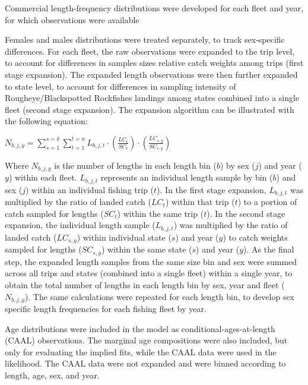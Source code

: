 \documentclass[
]{scrartcl}
\begin{document}
Commercial length-frequency distributions were developed for each fleet
and year, for which observations were available

Females and males distributions were treated separately, to track
sex-specific differences. For each fleet, the raw observations were
expanded to the trip level, to account for differences in samples sizes
relative catch weights among trips (first stage expansion). The expanded
length observations were then further expanded to state level, to
account for differences in sampling intensity of Rougheye/Blackspotted
Rockfishes landings among states combined into a single fleet (second
stage expansion). The expansion algorithm can be illustrated with the
following equation:

\begin{centering}

$N_{b,j,y} = \displaystyle\sum_{s=1}^{s=k}\displaystyle\sum_{t=1}^{t=n}L_{b,j,t} \cdot
\left(\frac{LC_t}{SC_t}\right) \cdot \left(\frac{LC_{s,y}}{SC_{s,y}}\right)$

\end{centering}

Where \(N_{b,j,y}\) is the number of lengths in each length bin (\(b\))
by sex (\(j\)) and year (\(y\)) within each fleet. \(L_{b,j,t}\)
represents an individual length sample by bin (\(b\)) and sex (\(j\))
within an individual fishing trip (\(t\)). In the first stage expansion,
\(L_{b,j,t}\) was multiplied by the ratio of landed catch (\(LC_t\))
within that trip (\(t\)) to a portion of catch sampled for lengths
(\(SC_t\)) within the same trip (\(t\)). In the second stage expansion,
the individual length sample (\(L_{b,j,t}\)) was multiplied by the ratio
of landed catch (\(LC_{s,y}\)) within individual state (\(s\)) and year
(\(y\)) to catch weights sampled for lengths (\(SC_{s,y}\)) within the
same state (\(s\)) and year (\(y\)). As the final step, the expanded
length samples from the same size bin and sex were summed across all
trips and states (combined into a single fleet) within a single year, to
obtain the total number of lengths in each length bin by sex, year and
fleet (\(N_{b,j,y}\)). The same calculations were repeated for each
length bin, to develop sex specific length frequencies for each fishing
fleet by year.

Age distributions were included in the model as
conditional-ages-at-length (CAAL) observations. The marginal age
compositions were also included, but only for evaluating the implied
fits, while the CAAL data were used in the likelihood. The CAAL data
were not expanded and were binned according to length, age, sex, and
year.
\end{document}
